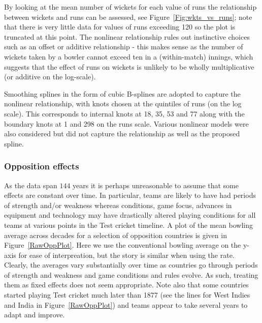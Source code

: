 \documentclass{statsoc}
\newcommand{\numyears}{144} %
\begin{document}
By looking at the mean number of wickets for each value of runs the relationship between wickets and runs can be assessed, see Figure~\ref{Fig:wkts_vs_runs}; note that there is very little data for values of runs exceeding 120 so the plot is truncated at this point. The nonlinear relationship rules out instinctive choices such as an offset or additive relationship - this makes sense as the number of wickets taken by a bowler cannot exceed ten in a (within-match) innings, which suggests that the effect of runs on wickets is unlikely to be wholly multiplicative (or additive on the log-scale).


Smoothing splines in the form of cubic B-splines are adopted to capture the nonlinear relationship, with knots chosen at the quintiles of runs (on the log scale). This corresponds to internal knots at 18, 35, 53 and 77 along with the boundary knots at 1 and 298 on the runs scale. Various nonlinear models were also considered but did not capture the relationship as well as the proposed spline.

\subsubsection{Opposition effects}\label{subsec:opp_data}
As the data span $\numyears$ years it is perhaps unreasonable to assume that some effects are constant over time. In particular, teams are likely to have had periods of strength and/or weakness whereas conditions, game focus, advances in equipment and technology may have drastically altered playing conditions for all teams at various points in the Test cricket timeline. A plot of the mean bowling average across decades for a selection of opposition countries is given in Figure~\ref{RawOppPlot}. Here we use the conventional bowling average on the y-axis for ease of interpreation, but the story is similar when using the rate. Clearly, the averages vary substantially over time as countries go through periods of strength and weakness and game conditions and rules evolve. As such, treating them as fixed effects does not seem appropriate. Note also that some countries started playing Test cricket much later than 1877 (see the lines for West Indies and India in Figure~\ref{RawOppPlot}) and teams appear to take several years to adapt and improve.
\end{document}
